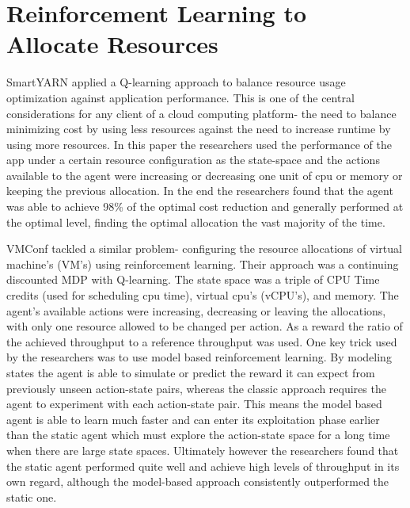 \section{Reinforcement Learning to Allocate Resources}
 \label{sec:rl_allocation}
 
SmartYARN applied a Q-learning approach to balance resource  usage optimization against application performance. This is one of the central considerations for any client of a cloud computing platform- the need to balance minimizing cost by using less resources against the need to increase runtime by using more resources. In this paper the researchers used the performance of the app under a certain resource configuration as the state-space and the actions available to the agent were increasing or decreasing one unit of cpu or memory or keeping the previous allocation. In the end the researchers found that the agent was able to achieve 98\% of the optimal cost reduction and generally performed at the optimal level, finding the optimal allocation the vast majority of the time.

VMConf tackled a similar problem- configuring the resource allocations of virtual machine's (VM's) using reinforcement learning. Their approach was a continuing discounted MDP with Q-learning. The state space was a triple of CPU Time credits (used for scheduling cpu time), virtual cpu's (vCPU's), and memory. The agent's available actions were increasing, decreasing or leaving the allocations, with only one resource allowed to be changed per action. As a reward the ratio of the achieved throughput to a reference throughput was used. One key trick used by the researchers was to use model based reinforcement learning. By modeling states the agent is able to simulate or predict the reward it can expect from previously unseen action-state pairs, whereas the classic approach requires the agent to experiment with each action-state pair. This means the model based agent is able to learn much faster and can enter its exploitation phase earlier than the static agent which must explore the action-state space for a long time when there are large state spaces. Ultimately however the researchers found that the static agent performed quite well and achieve high levels of throughput in its own regard, although the model-based approach consistently outperformed the static one. 

